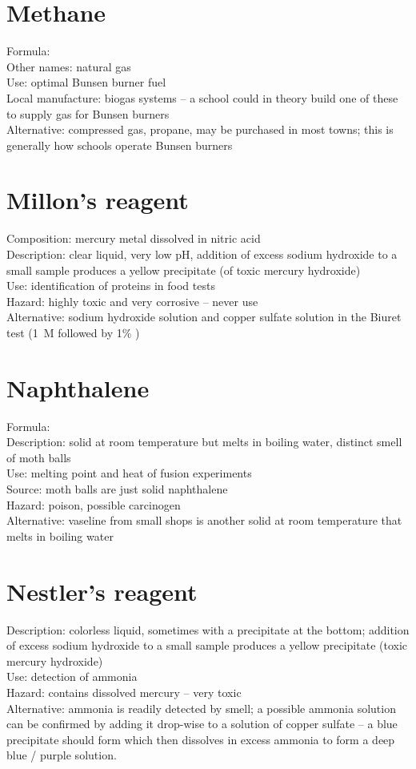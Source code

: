 \section{Methane}
\label{sec:}
Formula: \\
Other names: natural gas\\
Use: optimal Bunsen burner fuel\\
Local manufacture: biogas systems --
a school could in theory build one of these to supply gas for Bunsen burners\\
Alternative: compressed gas, 
propane, 
may be purchased in most towns; 
this is generally how schools operate Bunsen burners

\section{Millon's reagent}
\label{sec:}
Composition: mercury metal dissolved in nitric acid\\
Description: clear liquid, 
very low pH, 
addition of excess sodium hydroxide to a small sample 
produces a yellow precipitate (of toxic mercury hydroxide)\\
Use: identification of proteins in food tests\\
Hazard: highly toxic and very corrosive -- never use\\
Alternative: sodium hydroxide solution 
and copper sulfate solution in the Biuret test 
(1~M  followed by 1\% )

\section{Naphthalene}
\label{sec:}
Formula: \\
Description: solid at room temperature but melts in boiling water, 
distinct smell of moth balls\\
Use: melting point and heat of fusion experiments\\
Source: moth balls are just solid naphthalene\\
Hazard: poison, 
possible carcinogen\\
Alternative: vaseline from small shops is 
another solid at room temperature that melts in boiling water

\section{Nestler's reagent}
\label{sec:}
Description: colorless liquid, 
sometimes with a precipitate at the bottom; 
addition of excess sodium hydroxide to a small sample 
produces a yellow precipitate (toxic mercury hydroxide)\\
Use: detection of ammonia\\
Hazard: contains dissolved mercury -- very toxic\\
Alternative: ammonia is readily detected by smell; 
a possible ammonia solution can be confirmed by adding it drop-wise 
to a solution of copper sulfate -- 
a blue precipitate should form 
which then dissolves in excess ammonia to form a deep blue / purple solution.

